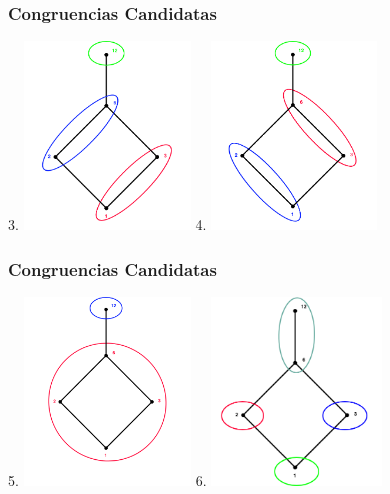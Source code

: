 \documentclass{beamer}
\begin{document}

\begin{frame}
\frametitle{Congruencias Candidatas}
\begin{center}
3. \includegraphics[height=5cm]{congruencia_3}
4. \includegraphics[height=5cm]{congruencia_4}
\end{center}
\end{frame}

\begin{frame}
\frametitle{Congruencias Candidatas}
\begin{center}
5. \includegraphics[height=5cm]{congruencia_5}
6. \includegraphics[height=5cm]{congruencia_6}
\end{center}
\end{frame}
\end{document}

